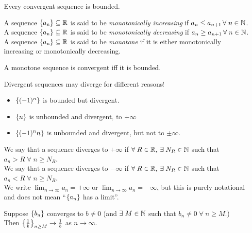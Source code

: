 \documentclass[12pt]{article}
\begin{document}
\begin{thm} \label{thm:convergent=>bounded}
    Every convergent sequence is bounded.
\end{thm}

\begin{defn} \label{defn:monotone seq}
    A sequence $\set{a_{n}} \subseteq \R$ is said to be \emph{monotonically increasing} if $a_{n} \leq a_{n+1} \,\forall\; n \in \mathbb{N}$. \\
    A sequence $\set{a_{n}} \subseteq \R$ is said to be \emph{monotonically decreasing} if $a_{n} \geq a_{n+1} \,\forall\; n \in \mathbb{N}$. \\
    A sequence $\set{a_{n}} \subseteq \R$ is said to be \emph{monotone} if it is either monotonically increasing or monotonically decreasing.
\end{defn}

\begin{thm} \label{thm:MCT}
    A monotone sequence is convergent iff it is bounded.
\end{thm}

\begin{rem}[Warning!]
    Divergent sequences may diverge for different reasons!
    \begin{itemize}
        \item $\set{(-1)^{n}}$ is bounded but divergent.
        \item $\set{n}$ is unbounded and divergent, to $+\infty$
        \item $\set{(-1)^{n}n}$ is unbounded and divergent, but not to $\pm \infty$.
    \end{itemize}
\end{rem}

\begin{defn} \label{defn:diverging to infinity}
    We say that a sequence diverges to $+\infty$ if $\forall\; R \in \mathbb{R}$, $\exists\; N_{R} \in \mathbb{N}$ such that $a_{n} > R \;\forall\; n \geq N_{R}$. \\
    We say that a sequence diverges to $-\infty$ if $\forall\; R \in \mathbb{R}$, $\exists\; N_{R} \in \mathbb{N}$ such that $a_{n} < R \;\forall\; n \geq N_{R}$. \\
    We write $\lim_{n \to \infty} a_{n} = +\infty$ or $\lim_{n \to \infty} a_{n} = -\infty$, but this is purely notational and does not mean ``$\set{a_{n}}$ has a limit''.
\end{defn}

\begin{thm} \label{thm:}
    Suppose $\set{b_{n}}$ converges to $b \neq 0$ (and $\exists\; M \in \mathbb{N}$ such that $b_{n} \neq 0 \;\forall\; n \geq M$.) \\
    Then $\set{ \frac{1}{b} }_{n \geq M} \to \frac{1}{b}$ as $n \to \infty$.
\end{thm}
\end{document}

